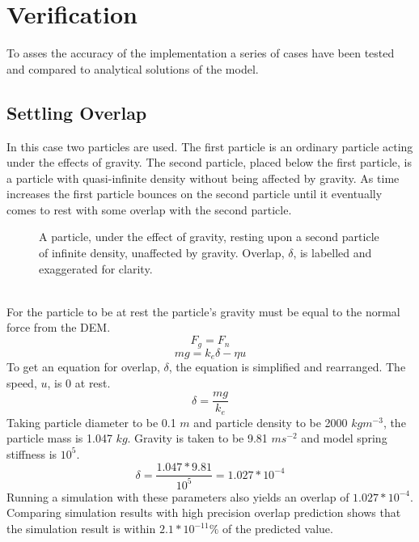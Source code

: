 \documentclass[10pt,a4paper,titlepage]{report}
\begin{document}
\section{Verification}
To asses the accuracy of the implementation a series of cases have been tested and compared to analytical solutions of the model.
\subsection{Settling Overlap}
In this case two particles are used. The first particle is an ordinary particle acting under the effects of gravity. The second particle, placed below the first particle, is a particle with quasi-infinite density without being affected by gravity. As time increases the first particle bounces on the second particle until it eventually comes to rest with some overlap with the second particle.\\
\begin{figure}[!htb]
\centering
{}
\caption{A particle, under the effect of gravity, resting upon a second particle of infinite density, unaffected by gravity. Overlap, $\delta$, is labelled and exaggerated for clarity.}
\end{figure}
\\For the particle to be at rest the particle's gravity must be equal to the normal force from the DEM.
\begin{equation}
F_{g} = F_{n}
\end{equation}
\begin{equation}
mg = k_{e}\delta - \eta u
\end{equation}
To get an equation for overlap, $\delta$, the equation is simplified and rearranged. The speed, $u$, is 0 at rest.
\begin{equation}
\delta = \dfrac{mg}{k_{e}}
\end{equation} 
Taking particle diameter to be 0.1 $m$ and particle density to be 2000 $kg m^{-3}$, the particle mass is 1.047 $kg$. Gravity is taken to be 9.81 $m s^{-2}$ and model spring stiffness is $10^{5}$.
\begin{equation}
\delta = \dfrac{1.047 * 9.81}{10^{5}} = 1.027 * 10^{-4}
\end{equation} 
Running a simulation with these parameters also yields an overlap of $1.027 * 10^{-4}$. Comparing simulation results with high precision overlap prediction shows that the simulation result is within $2.1 * 10^{-11}\%$ of the predicted value.
\end{document}
